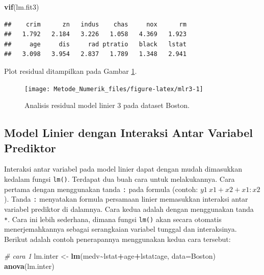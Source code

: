 \documentclass[
]{book}
\newenvironment{Shaded}{\begin{snugshade}}{\end{snugshade}}
\newcommand{\AttributeTok}[1]{\textcolor[rgb]{0.13,0.29,0.53}{#1}}
\newcommand{\CommentTok}[1]{\textcolor[rgb]{0.56,0.35,0.01}{\textit{#1}}}
\newcommand{\FunctionTok}[1]{\textcolor[rgb]{0.13,0.29,0.53}{\textbf{#1}}}
\newcommand{\NormalTok}[1]{#1}
\newcommand{\OtherTok}[1]{\textcolor[rgb]{0.56,0.35,0.01}{#1}}
\newcommand{\SpecialCharTok}[1]{\textcolor[rgb]{0.81,0.36,0.00}{\textbf{#1}}}
\theoremstyle{definition}
\theoremstyle{definition}
\theoremstyle{definition}
\theoremstyle{definition}
\theoremstyle{remark}
\begin{document}
\begin{Shaded}
\begin{Highlighting}[]
\FunctionTok{vif}\NormalTok{(lm.fit3)}
\end{Highlighting}
\end{Shaded}

\begin{verbatim}
##    crim      zn   indus    chas     nox      rm 
##   1.792   2.184   3.226   1.058   4.369   1.923 
##     age     dis     rad ptratio   black   lstat 
##   3.098   3.954   2.837   1.789   1.348   2.941
\end{verbatim}

Plot residual ditampilkan pada Gambar \ref{fig:mlr3}.

\begin{figure}

{\centering \texttt{[image: Metode\_Numerik\_files/figure-latex/mlr3-1]} 

}

\caption{Analisis residual model linier 3 pada dataset Boston.}\label{fig:mlr3}
\end{figure}

\hypertarget{lminter}{%
\subsection{Model Linier dengan Interaksi Antar Variabel Prediktor}\label{lminter}}

Interaksi antar variabel pada model linier dapat dengan mudah dimasukkan kedalam fungsi \texttt{lm()}. Terdapat dua buah cara untuk melakukannya. Cara pertama dengan menggunakan tanda \texttt{:} pada formula (contoh: \(y1 ~ x1+x2+x1:x2\)). Tanda \texttt{:} menyatakan formula persamaan linier memasukkan interaksi antar variabel prediktor di dalamnya. Cara kedua adalah dengan menggunakan tanda \texttt{*}. Cara ini lebih sederhana, dimana fungsi \texttt{lm()} akan secara otomatis menerjemahkannya sebagai serangkaian variabel tunggal dan interaksinya. Berikut adalah contoh penerapannya menggunakan kedua cara tersebut:

\begin{Shaded}
\begin{Highlighting}[]
\CommentTok{\# cara 1}
\NormalTok{lm.inter }\OtherTok{\textless{}{-}} \FunctionTok{lm}\NormalTok{(medv}\SpecialCharTok{\textasciitilde{}}\NormalTok{lstat}\SpecialCharTok{+}\NormalTok{age}\SpecialCharTok{+}\NormalTok{lstat}\SpecialCharTok{:}\NormalTok{age, }\AttributeTok{data=}\NormalTok{Boston)}
\FunctionTok{anova}\NormalTok{(lm.inter)}
\end{Highlighting}
\end{Shaded}
\end{document}
